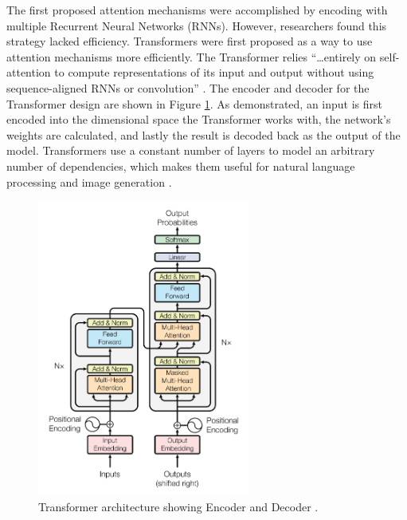 \documentclass[letterpaper]{article} %
\begin{document}
The first proposed attention mechanisms were accomplished by encoding with 
multiple Recurrent Neural Networks (RNNs). However, researchers found this 
strategy lacked efficiency. Transformers were first proposed
as a way to use attention mechanisms more efficiently.
The Transformer relies
``\dots entirely on self-attention to compute representations of its input and 
output
without using sequence-aligned RNNs or convolution''
\cite{attention_need}.
The encoder and decoder for the Transformer design
are shown in Figure \ref{fig:transformer}.
As demonstrated, an input is first encoded into the dimensional space
the Transformer works with, the network's weights are calculated,
and lastly the result is decoded back as the output of the model.
Transformers use a constant number of layers to model an arbitrary number of 
dependencies, which makes them useful for natural language processing and 
image generation \cite{generative_transformers}.

\begin{figure}[htbp]
\centerline{\includegraphics[width=7cm]{transformer.png}}
\caption{Transformer architecture showing Encoder and Decoder
\cite{attention_need}.}
\label{fig:transformer}
\end{figure}
\end{document}
